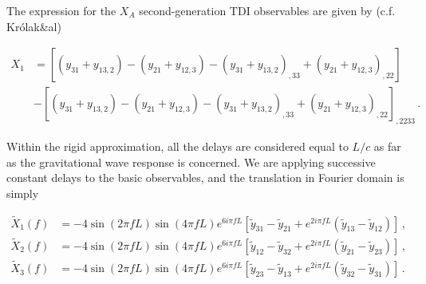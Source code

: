 \documentclass[aps,showpacs,twocolumn,prd,superscriptaddress,nofootinbib]{revtex4}
\newcommand{\nn}{\nonumber}
\begin{document}
The expression for the $X_{A}$ second-generation TDI observables are given by (c.f. Kr\'olak\&al)
%
\begin{widetext}
\begin{align}
	X_{1} &= \left[ \left( y_{31} + y_{13,2} \right) - \left( y_{21} + y_{12,3} \right) - \left( y_{31} + y_{13,2} \right)_{,33} + \left( y_{21} + y_{12,3} \right)_{,22} \right] \nn\\
	& - \left[ \left( y_{31} + y_{13,2} \right) - \left( y_{21} + y_{12,3} \right) - \left( y_{31} + y_{13,2} \right)_{,33} + \left( y_{21} + y_{12,3} \right)_{,22} \right]_{,2233} \,.
\end{align}
\end{widetext}
%
Within the rigid approximation, all the delays are considered equal to $L/c$ as far as the gravitational wave response is concerned. We are applying successive constant delays to the basic observables, and the translation in Fourier domain is simply
%
\begin{widetext}
\begin{align}
	\tilde{X}_{1}(f) &= -4 \sin\left( 2\pi f L \right) \sin\left( 4\pi f L \right) e^{6 i \pi f L} \left[ \tilde{y}_{31} - \tilde{y}_{21} + e^{2i\pi f L} \left( \tilde{y}_{13} - \tilde{y}_{12} \right) \right] \,, \nn\\
	\tilde{X}_{2}(f) &= -4 \sin\left( 2\pi f L \right) \sin\left( 4\pi f L \right) e^{6 i \pi f L} \left[ \tilde{y}_{12} - \tilde{y}_{32} + e^{2i\pi f L} \left( \tilde{y}_{21} - \tilde{y}_{23} \right) \right] \,, \nn\\
	\tilde{X}_{3}(f) &= -4 \sin\left( 2\pi f L \right) \sin\left( 4\pi f L \right) e^{6 i \pi f L}\left[ \tilde{y}_{23} - \tilde{y}_{13} + e^{2i\pi f L} \left( \tilde{y}_{32} - \tilde{y}_{31} \right) \right] \,.
\end{align}
\end{widetext}
%
\end{document}
